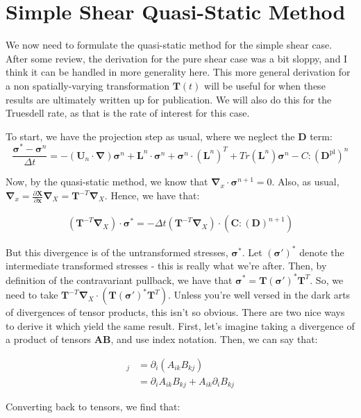 \documentclass[11pt]{article}
\newcommand{\p}{\partial}
\newcommand{\bsig}{\boldsymbol\sigma}
\newcommand{\bC}{\mathbf{C}}
\newcommand{\bD}{\mathbf{D}}
\newcommand{\bL}{\mathbf{L}}
\newcommand{\bT}{\mathbf{T}}
\newcommand{\bU}{\mathbf{U}}
\newcommand{\bX}{\mathbf{X}}
\newcommand{\bx}{\mathbf{x}}
\newcommand{\bDpl}{\bD^\text{pl}}
\newcommand{\bgrad}{\boldsymbol{\nabla}}
\newcommand{\advn}{\left(\bU_n\cdot\bgrad\right)}
\newcommand{\bA}{\mathbf{A}}
\newcommand{\bB}{\mathbf{B}}
\begin{document}
\section*{Simple Shear Quasi-Static Method}

We now need to formulate the quasi-static method for the simple shear case. After some review, the derivation for the pure shear case was a bit sloppy, and I think it can be handled in more generality here. This more general derivation for a non spatially-varying transformation $\bT(t)$ will be useful for when these results are ultimately written up for publication. We will also do this for the Truesdell rate, as that is the rate of interest for this case.

To start, we have the projection step as usual, where we neglect the $\bD$ term:
\begin{equation}
    \frac{\bsig^* - \bsig^n}{\Delta t} = -\advn \bsig^n + \bL^n \cdot \bsig^n + \bsig^n \cdot (\bL^n)^T + Tr(\bL^n)\bsig^n - C:(\bDpl)^n
\end{equation}

Now, by the quasi-static method, we know that $\bgrad_x\cdot\bsig^{n+1} = 0$. Also, as usual, $\bgrad_x = \frac{\p \bX}{\p \bx}\bgrad_X = \bT^{-T}\bgrad_X$. Hence, we have that:

\begin{align*}
    \left(\bT^{-T}\bgrad_X\right)\cdot \bsig^* = -\Delta t \left(\bT^{-T} \bgrad_X \right)\cdot \left(\bC : (\bD)^{n+1}\right)
\end{align*}

But this divergence is of the untransformed stresses, $\bsig^*$. Let $(\bsig')^*$ denote the intermediate transformed stresses - this is really what we're after. Then, by definition of the contravariant pullback, we have that $\bsig^* = \bT (\bsig')^* \bT^T$. So, we need to take $\bT^{-T}\bgrad_X \cdot (\bT (\bsig')^*\bT^T)$. Unless you're well versed in the dark arts of divergences of tensor products, this isn't so obvious. There are two nice ways to derive it which yield the same result. First, let's imagine taking a divergence of a product of tensors $\bA \bB$, and use index notation. Then, we can say that:

\begin{align*}
    [\bgrad\cdot (\bA \bB)]_j &= \p_i (A_{ik} B_{kj})\\
    &= \p_i A_{ik} B_{kj} + A_{ik}\p_i B_{kj}
\end{align*}

Converting back to tensors, we find that:
\end{document}
